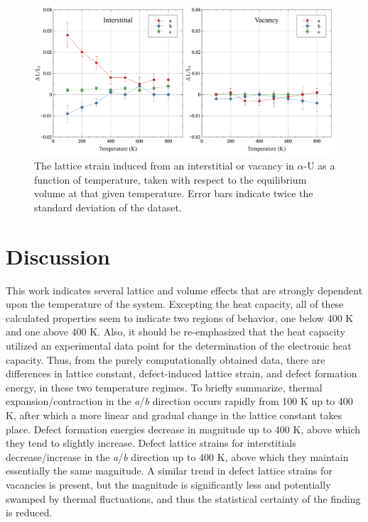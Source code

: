 \documentclass[utf8]{frontiersSCNS} %
\begin{document}
 \begin{figure}[hbt]
	\centering
	\includegraphics[width=1.0\textwidth]{defect_strain.jpg}
  \caption{The lattice strain induced from an interstitial or vacancy in $\alpha$-U as a function of temperature, taken with respect to the equilibrium volume at that given temperature. Error bars indicate twice the standard deviation of the dataset.}\label{fig:strain}
\end{figure}

\FloatBarrier

\section{Discussion}

This work indicates several lattice and volume effects that are strongly dependent upon the temperature of the system. Excepting the heat capacity, all of these calculated properties seem to indicate two regions of behavior, one below 400 K and one above 400 K. Also, it should be re-emphasized that the heat capacity utilized an experimental data point for the determination of the electronic heat capacity. Thus, from the purely computationally obtained data, there are differences in lattice constant, defect-induced lattice strain, and defect formation energy, in these two temperature regimes. To briefly summarize, thermal expansion/contraction in the \textit{a}/\textit{b} direction occurs rapidly from 100 K up to 400 K, after which a more linear and gradual change in the lattice constant takes place. Defect formation energies decrease in magnitude up to 400 K, above which they tend to slightly increase. Defect lattice strains for interstitials decrease/increase in the \textit{a}/\textit{b} direction up to 400 K, above which they maintain essentially the same magnitude. A similar trend in defect lattice strains for vacancies is present, but the magnitude is significantly less and potentially swamped by thermal fluctuations, and thus the statistical certainty of the finding is reduced. 
\end{document}
